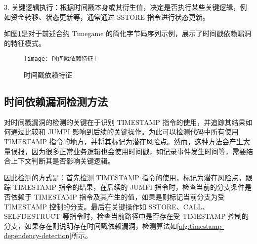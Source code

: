 \documentclass[print, master, vlined, timesmath]{DissertUESTC}
\begin{document}
3. 关键逻辑执行：根据时间戳本身或其衍生值，决定是否执行某些关键逻辑，例如资金转移、状态更新等，通常通过 SSTORE 指令进行状态更新。

如图\ref{fig:时间戳依赖特征}是对于前述合约 Timegame 的简化字节码序列示例，展示了时间戳依赖漏洞的特征模式。



\begin{figure}[h]
    \centering
    \texttt{[image: 时间戳依赖特征]}
    \caption{时间戳依赖特征}
    \label{fig:时间戳依赖特征}
\end{figure}

\subsection{时间依赖漏洞检测方法}
对时间戳漏洞的检测的关键在于识别 TIMESTAMP 指令的使用，并追踪其结果如何通过比较和 JUMPI 影响到后续的关键操作。为此可以检测代码中所有使用 TIMESTAMP 指令的地方，并将其标记为潜在风险点。然而，这种方法会产生大量误报，因为很多正常业务逻辑也会使用时间戳，如记录事件发生时间等，需要结合上下文判断其是否影响关键逻辑。

因此检测的方式是：首先检测 TIMESTAMP 指令的使用，标记为潜在风险点，跟踪 TIMESTAMP 指令的结果，在后续的 JUMPI 指令时，检查当前的分支条件是否依赖于 TIMESTAMP 指令及其产生的值，如果是则标记当前分支为受 TIMESTAMP 控制的分支。最后在关键操作如 SSTORE、CALL、SELFDESTRUCT 等指令时，检查当前路径中是否存在受 TIMESTAMP 控制的分支，如果存在则说明存在时间戳依赖漏洞，检测算法如\ref{alg:timestamp-dependency-detection}所示。

\end{document}
